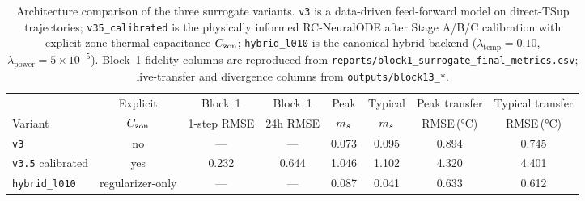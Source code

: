 \begin{table}[t]
  \centering
  \caption{Architecture comparison of the three surrogate variants. \texttt{v3} is a data-driven feed-forward model on direct-TSup trajectories; \texttt{v35\_calibrated} is the physically informed RC-NeuralODE after Stage A/B/C calibration with explicit zone thermal capacitance $C_{\mathrm{zon}}$; \texttt{hybrid\_l010} is the canonical hybrid backend ($\lambda_{\mathrm{temp}}=0.10$, $\lambda_{\mathrm{power}}=5\times10^{-5}$). Block~1 fidelity columns are reproduced from \texttt{reports/block1\_surrogate\_final\_metrics.csv}; live-transfer and divergence columns from \texttt{outputs/block13\_*}.}
  \label{tab:architecture}
  \begin{tabular}{lccccccc}
    \toprule
    & Explicit & Block~1 & Block~1 & Peak & Typical & Peak transfer & Typical transfer\\
    Variant & $C_{\mathrm{zon}}$ & 1-step RMSE & 24h RMSE & $m_s$ & $m_s$ & RMSE\,(\si{\celsius}) & RMSE\,(\si{\celsius})\\
    \midrule
    \texttt{v3} & no & --- & --- & 0.073 & 0.095 & 0.894 & 0.745 \\
    \texttt{v3.5} calibrated & yes & 0.232 & 0.644 & 1.046 & 1.102 & 4.320 & 4.401 \\
    \texttt{hybrid\_l010} & regularizer-only & --- & --- & 0.087 & 0.041 & 0.633 & 0.612 \\
    \bottomrule
  \end{tabular}
\end{table}
